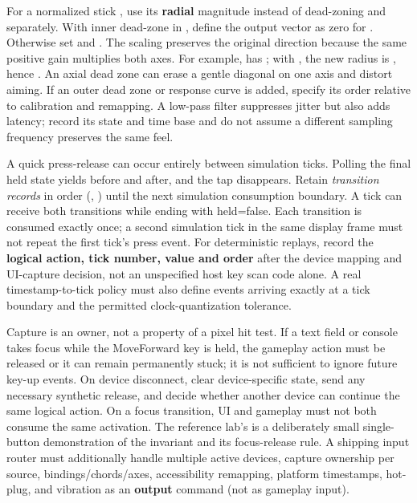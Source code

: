 For a normalized stick , use its \textbf{radial} magnitude  instead of dead-zoning  and  separately. With inner dead-zone  in \BookInlineCode{{[}0,1)}, define the output vector as zero for . Otherwise set  and . The scaling preserves the original direction because the same positive gain multiplies both axes. For example,  has ; with , the new radius is , hence . An axial dead zone can erase a gentle diagonal on one axis and distort aiming. If an outer dead zone or response curve is added, specify its order relative to calibration and remapping. A low-pass filter suppresses jitter but also adds latency; record its state and time base and do not assume a different sampling frequency preserves the same feel.

A quick press-release can occur entirely between simulation ticks. Polling the final held state yields  before and  after, and the tap disappears. Retain \emph{transition records} in order (, ) until the next simulation consumption boundary. A tick can receive both transitions while ending with held=false. Each transition is consumed exactly once; a second simulation tick in the same display frame must not repeat the first tick's press event. For deterministic replays, record the \textbf{logical action, tick number, value and order} after the device mapping and UI-capture decision, not an unspecified host key scan code alone. A real timestamp-to-tick policy must also define events arriving exactly at a tick boundary and the permitted clock-quantization tolerance.

Capture is an owner, not a property of a pixel hit test. If a text field or console takes focus while the MoveForward key is held, the gameplay action must be released or it can remain permanently stuck; it is not sufficient to ignore future key-up events. On device disconnect, clear device-specific state, send any necessary synthetic release, and decide whether another device can continue the same logical action. On a focus transition, UI and gameplay must not both consume the same activation. The reference lab's  is a deliberately small single-button demonstration of the invariant and its focus-release rule. A shipping input router must additionally handle multiple active devices, capture ownership per source, bindings/chords/axes, accessibility remapping, platform timestamps, hot-plug, and vibration as an \textbf{output} command (not as gameplay input).

